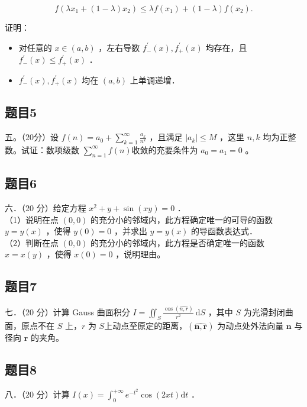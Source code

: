 \documentclass{article}
\begin{document}
\[
f\left(\lambda x_{1}+(1-\lambda) x_{2}\right) \leq \lambda f\left(x_{1}\right)+(1-\lambda) f\left(x_{2}\right) .
\]

证明：

\begin{itemize}
  \item[（1）] 对任意的 \(x \in(a, b)\) ，左右导数 \(f_{-}^{\prime}(x), f_{+}^{\prime}(x)\) 均存在，且 \(f_{-}^{\prime}(x) \leq f_{+}^{\prime}(x)\) ．
  \item[（2）] \(f_{-}^{\prime}(x), f_{+}^{\prime}(x)\) 均在 \((a, b)\) 上单调递增．
\end{itemize}

\subsection{题目5}
五。（20分）设 \(f(n)=a_{0}+\sum_{k=1}^{\infty} \frac{a_{k}}{n^{k}}\) ，且满足 \(\left|a_{k}\right| \leq M\) ，这里 \(n, k\) 均为正整数。试证：数项级数 \(\sum_{n=1}^{\infty} f(n)\)收敛的充要条件为 \(a_{0}=a_{1}=0\) 。

\subsection{题目6}
六．（20 分）给定方程 \(x^{2}+y+\sin (x y)=0\) ．\\
（1）说明在点 \((0,0)\) 的充分小的邻域内，此方程确定唯一的可导的函数 \(y=y(x)\) ，使得 \(y(0)=0\) ，并求出 \(y=y(x)\) 的导函数表达式．\\
（2）判断在点 \((0,0)\) 的充分小的邻域内，此方程是否确定唯一的函数 \(x=x(y)\) ，使得 \(x(0)=0\) ，说明理由。

\subsection{题目7}
七．（20 分）计算 Gauss 曲面积分 \(I=\iint_{S} \frac{\cos (\widehat{n, r})}{r^{2}} \mathrm{~d} S\) ，其中 \(S\) 为光滑封闭曲面，原点不在 \(S\) 上，\(r\) 为 \(S\)上动点至原定的距离，\((\widehat{\mathbf{n}, \mathbf{r}})\) 为动点处外法向量 \(\mathbf{n}\) 与径向 \(\mathbf{r}\) 的夹角。

\subsection{题目8}
八．（20 分）计算 \(I(x)=\int_{0}^{+\infty} e^{-t^{2}} \cos (2 x t) \mathrm{d} t\) ．
\end{document}
